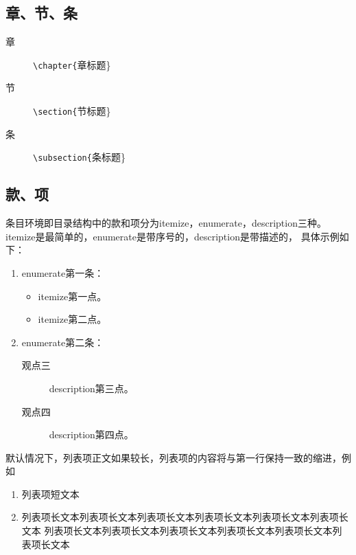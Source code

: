 \subsection{章、节、条}
\label{subsec-chap-etc}

\begin{description}
    \item[章] \verb|\chapter{|章标题\}
    \item[节] \verb|\section{|节标题\}
    \item[条] \verb|\subsection{|条标题\}
\end{description}

\subsection{款、项}
\label{subsec-item}
条目环境即目录结构中的款和项分为itemize，enumerate，description三种。
itemize是最简单的，enumerate是带序号的，description是带描述的，
具体示例如下：

\begin{enumerate}
    \item enumerate第一条：
        \begin{itemize}
            \item itemize第一点。
            \item itemize第二点。
        \end{itemize}
    \item enumerate第二条：
        \begin{description}
            \item[观点三] description第三点。
            \item[观点四] description第四点。
        \end{description}
\end{enumerate}

默认情况下，列表项正文如果较长，列表项的内容将与第一行保持一致的缩进，例如

\begin{enumerate}
\item 列表项短文本
\item 列表项长文本列表项长文本列表项长文本列表项长文本列表项长文本列表项长文本
列表项长文本列表项长文本列表项长文本列表项长文本列表项长文本列表项长文本
\end{enumerate}

